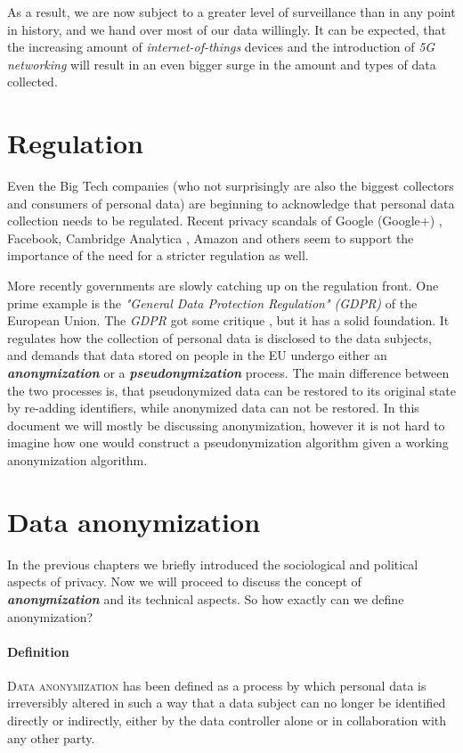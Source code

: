 As a result, we are now subject to a greater level of surveillance than in any point in history, and we hand over most of our data willingly. \cite{factortech01} It can be expected, that the increasing amount of \textit{internet-of-things} devices and the introduction of \textit{5G networking} will result in an even bigger surge in the amount and types of data collected.

\section{Regulation}
Even the Big Tech companies (who not surprisingly are also the biggest collectors and consumers of personal data) are
beginning to acknowledge that personal data collection needs to be regulated. \cite{wired01} Recent privacy scandals of Google (Google+) \cite{precursor01}, Facebook, Cambridge Analytica \cite{wiki01}, Amazon \cite{wiki02} and others \cite{technadu01} seem to support the importance of the need for a stricter regulation as well.

More recently governments are slowly catching up on the regulation front. One prime example is the \textit{"General Data Protection Regulation" (GDPR)} of the European Union. The \textit{GDPR} got some critique \cite{clearcritique,thomsonreuters}, but it has a solid foundation. It regulates how the collection of personal data is disclosed to the data subjects, and demands that data stored on people in the EU undergo either an \textbf{\textit{anonymization}} or a \textbf{\textit{pseudonymization}} process. \cite{wiki03, wiki04} The main difference between the two processes is, that pseudonymized data can be restored to its original state by re-adding identifiers, while anonymized data can not be restored. In this document we will mostly be discussing anonymization, however it is not hard to imagine how one would construct a pseudonymization algorithm given a working anonymization algorithm.

\section{Data anonymization}
In the previous chapters we briefly introduced the sociological and political aspects of privacy. Now we will proceed to discuss the concept of \textbf{\textit{anonymization}} and its technical aspects. So how exactly can we define anonymization?

\paragraph{Definition} \textsc{Data anonymization} has been defined as a process by which personal data is irreversibly altered in such a way that a data subject can no longer be identified directly or indirectly, either by the data controller alone or in collaboration with any other party. \cite{wiki04, iso01}

